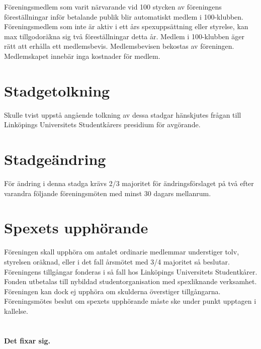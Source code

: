 \documentclass[a4paper]{article}
\begin{document}
Föreningsmedlem som varit närvarande vid 100 stycken av föreningens föreställningar inför betalande publik blir automatiskt medlem i 100-klubben.\newline
\newline
Föreningsmedlem som inte är aktiv i ett års spexuppsättning eller styrelse, kan max tillgodoräkna sig två föreställningar detta år.\newline
\newline
Medlem i 100-klubben äger rätt att erhålla ett medlemsbevis. Medlemsbevisen bekostas av föreningen.\newline
\newline
Medlemskapet innebär inga kostnader för medlem.

\section{Stadgetolkning}
Skulle tvist uppstå angående tolkning av dessa stadgar hänskjutes frågan till Linköpings Universitets Studentkårers presidium för avgörande.

\section{Stadgeändring}
För ändring i denna stadga krävs 2/3 majoritet för ändringsförslaget på två efter varandra följande föreningsmöten med minst 30 dagars mellanrum.

\section{Spexets upphörande}
Föreningen skall upphöra om antalet ordinarie medlemmar understiger tolv, styrelsen oräknad, eller i det fall årsmötet med 3/4 majoritet så beslutar. Föreningens tillgångar fonderas i så fall hos Linköpings Universitets Studentkårer. Fonden utbetalas till nybildad studentorganisation med spexliknande verksamhet. Föreningen kan dock ej upphöra om skulderna överstiger tillgångarna. Föreningsmötes beslut om spexets upphörande måste ske under punkt upptagen i kallelse.

\setcounter{section}{16}
\section{ }
\textbf{Det fixar sig.}
\end{document}
